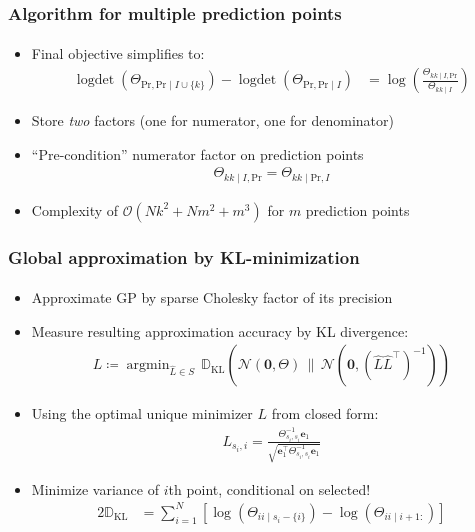 \documentclass{beamer}                             %
\renewcommand{\vec}[1]{\bm{#1}}
\renewcommand{\vec}[1]{\bm{#1}}
\DeclareMathOperator{\logdet}{logdet}
\DeclareMathOperator*{\argmin}{argmin}
\begin{document}
\begin{frame}
\frametitle{Algorithm for multiple prediction points}
\framesubtitle{}
\begin{itemize}
  \item<+-> Final objective simplifies to:
    \begin{align*}
      \logdet
      \left (
        \Theta_{\text{Pr}, \text{Pr} \mid I \cup \{ k \}}
      \right ) -
      \logdet \left ( \Theta_{\text{Pr}, \text{Pr} \mid I} \right ) &=
      \log
      \left (
        \frac{\Theta_{kk \mid I, \text{Pr}}}{\Theta_{kk \mid I}}
      \right )
    \end{align*}
  \item<+-> Store \emph{two} factors
    (one for numerator, one for denominator)
  \item<+-> ``Pre-condition'' numerator factor on prediction points
    \begin{align*}
      \Theta_{kk \mid I, \text{Pr}} = \Theta_{kk \mid \text{Pr}, I}
    \end{align*}
  \item<+-> Complexity of \( \mathcal{O}(N k^2 +
    N m^2 + m^3) \) for \( m \) prediction points
\end{itemize}
\end{frame}

\begin{frame}
\frametitle{Global approximation by KL-minimization}
\framesubtitle{}
\begin{itemize}
  \item<+-> Approximate GP by sparse Cholesky factor of its precision
  \item<+-> Measure resulting approximation accuracy by KL divergence:
    \begin{align*}
      L \coloneqq \argmin_{\hat{L} \in S} \, \mathbb{D}_{\text{KL}}
        \left (
          \mathcal{N}(\vec{0}, \Theta) \, \Big \| \,
          \mathcal{N}(\vec{0}, (\hat{L} \hat{L}^{\top})^{-1})
        \right )
    \end{align*}
  \item<+-> Using the optimal unique minimizer \( L \) from closed form:
    \begin{align*}
      L_{s_i, i} = \frac{\Theta_{s_i, s_i}^{-1} \vec{e}_1}
      {\sqrt{\vec{e}_1^{\top} \Theta_{s_i, s_i}^{-1} \vec{e}_1}}
    \end{align*}
  \item<+-> Minimize variance of \( i \)th point, conditional on selected!
    \begin{align*}
      2 \mathbb{D}_{\text{KL}}
      &= \sum_{i = 1}^N
        \left [
          \log \left ( \Theta_{ii \mid s_i - \{ i \}} \right ) -
          \log \left ( \Theta_{ii \mid i + 1:} \right )
        \right ]
    \end{align*}
\end{itemize}
\end{frame}
\end{document}
